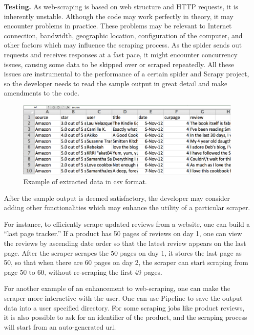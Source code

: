 \documentclass[12pt,twoside,draft]{report}
\begin{document}
\textbf{Testing.} As web-scraping is based on web structure and HTTP requests, it is inherently unstable. Although the code may work perfectly in theory, it may encounter problems in practice. These problems may be relevant to Internet connection, bandwidth, geographic location, configuration of the computer, and other factors which may influence the scraping process. As the spider sends out requests and receives responses at a fast pace, it might encounter concurrency issues, causing some data to be skipped over or scraped repeatedly. All these issues are instrumental to the performance of a certain spider and Scrapy project, so the developer needs to read the sample output in great detail and make amendments to the code.
\begin{figure}[htp]
\includegraphics[width=\textwidth]{sample_output.png}
\caption[Sample csv output]
{Example of extracted data in csv format.}
\end{figure}

After the sample output is deemed satisfactory, the developer may consider adding other functionalities which may enhance the utility of a particular scraper. 

For instance, to efficiently scrape updated reviews from a website, one can build a ``last page tracker.'' If a product has 50 pages of reviews on day 1, one can view the reviews by ascending date order so that the latest review appears on the last page. After the scraper scrapes the 50 pages on day 1, it stores the last page as 50, so that when there are 60 pages on day 2, the scraper can start scraping from page 50 to 60, without re-scraping the first 49 pages.

For another example of an enhancement to web-scraping, one can make the scraper more interactive with the user. One can use Pipeline to save the output data into a user specified directory. For some scraping jobs like product reviews, it is also possible to ask for an identifier of the product, and the scraping process will start from an auto-generated url.

\cleardoublepage
\end{document}
